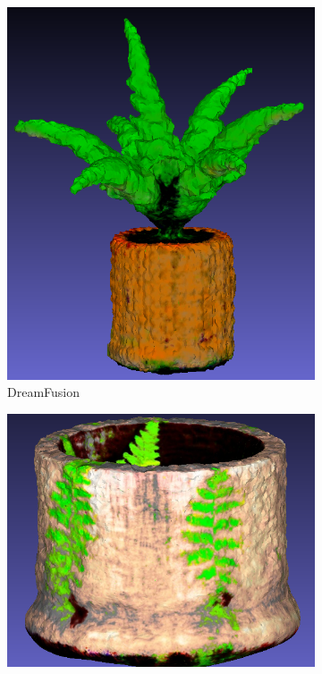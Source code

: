 \begin{figure}[ht]
    \centering
    \small
    \begin{subfigure}[b]{0.24\textwidth}
        \centering
        \includegraphics[width=\textwidth]{figures/subjective/dreamfusion_fern_result.png}
        \caption{DreamFusion}
        \vspace{0.1cm}
    \end{subfigure}
    \begin{subfigure}[b]{0.35\textwidth}
        \centering
        \includegraphics[width=\textwidth]{figures/subjective/magic3d_fern_result.png}

\end{subfigure}
\end{figure}
